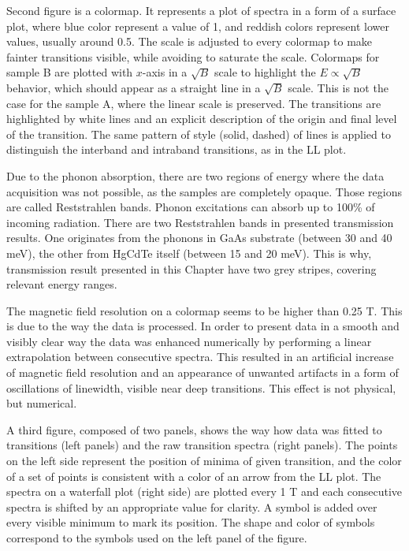 \documentclass[titlepage,a4paper]{book}
\begin{document}
Second figure is a colormap. It represents a plot of spectra in a form of a surface plot, where blue color represent a value of 1, and reddish colors represent lower values, usually around 0.5. The scale is adjusted to every colormap to make fainter transitions visible, while avoiding to saturate the scale. Colormaps for sample B are plotted with $x$-axis in a $\sqrt{B}$ scale to highlight the $E \propto \sqrt{B}$ behavior, which should appear as a straight line in a $\sqrt{B}$ scale. This is not the case for the sample A, where the linear scale is preserved. The transitions are highlighted by white lines and an explicit description of the origin and final level of the transition. The same pattern of style (solid, dashed) of lines is applied to distinguish the interband and intraband transitions, as in the LL plot. 

Due to the phonon absorption, there are two regions of energy where the data acquisition was not possible, as the samples are completely opaque. Those regions are called Reststrahlen bands. Phonon excitations can absorb up to 100\% of incoming radiation. There are two Reststrahlen bands in presented transmission results. One originates from the phonons in GaAs substrate (between 30 and 40 meV), the other from HgCdTe itself (between 15 and 20 meV). This is why, transmission result presented in this Chapter have two grey stripes, covering relevant energy ranges. 


The magnetic field resolution on a colormap seems to be higher than 0.25 T. This is due to the way the data is processed. In order to present data in a smooth and visibly clear way the data was enhanced numerically by performing a linear extrapolation between consecutive spectra. This resulted in an artificial increase of magnetic field resolution and an appearance of unwanted artifacts in a form of oscillations of linewidth, visible near deep transitions. This effect is not physical, but numerical.  

A third figure, composed of two panels, shows the way how data was fitted to transitions (left panels) and the raw transition spectra (right panels). The points on the left side represent the position of minima of given transition, and the color of a set of points is consistent with a color of an arrow from the LL plot. The spectra on a waterfall plot (right side) are plotted every 1 T and each consecutive spectra is shifted by an appropriate value for clarity. A symbol is added over every visible minimum to mark its position. The shape and color of symbols correspond to the symbols used on the left panel of the figure. 
\end{document}
